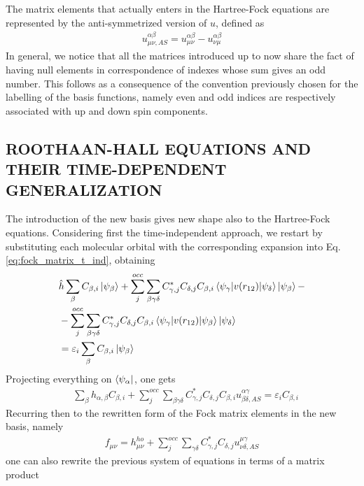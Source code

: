 The matrix elements that actually enters in the Hartree-Fock equations are represented by the anti-symmetrized version of $u$, defined as
\begin{align*}
    u^{\alpha\beta}_{\mu\nu,AS} = u^{\alpha\beta}_{\mu\nu} - u^{\alpha\beta}_{\nu\mu}
\end{align*}
In general, we notice that all the matrices introduced up to now share the fact of having null elements in correspondence of indexes whose sum gives an odd number. This follows as a consequence of the convention previously chosen for the labelling of the basis functions, namely even and odd indices are respectively associated with up and down spin components. 



\subsection{ROOTHAAN-HALL EQUATIONS AND THEIR TIME-DEPENDENT GENERALIZATION}
The introduction of the new basis gives new shape also to the Hartree-Fock equations. Considering first the time-independent approach, we restart by substituting each molecular orbital with the corresponding expansion into Eq.\,\ref{eq:fock_matrix_t_ind}, obtaining
\begin{align*}
    &\hat{h} \sum_{\beta} C_{\beta,i} \ket{\psi_\beta} + \sum_{j}^{occ} \sum_{\beta\gamma\delta} C_{\gamma,j}^* C_{\delta,j} C_{\beta,i} \bracketOP{\psi_\gamma}{\psi_\delta}{v(r_{12})} \ket{\psi_\beta} - \\
    &- \sum_{j}^{occ} \sum_{\beta\gamma\delta} C_{\gamma,j}^* C_{\delta,j} C_{\beta,i} \bracketOP{\psi_\gamma}{\psi_\beta}{v(r_{12})} \ket{\psi_\delta} \\
    &= \varepsilon_{i} \sum_{\beta} C_{\beta,i} \ket{\psi_\beta}
\end{align*}
Projecting everything on $\bra{\psi_\alpha}$, one gets
\begin{align*}
    & \sum_{\beta} h_{\alpha,\beta} C_{\beta,i} + \sum_{j}^{occ} \sum_{\beta\gamma\delta} C_{\gamma,j}^* C_{\delta,j} C_{\beta,i} u^{\alpha\gamma}_{\beta\delta,AS} =  \varepsilon_{i}  C_{\beta,i}
\end{align*}
Recurring then to the rewritten form of the Fock matrix elements in the new basis, namely
\begin{align*}
    f_{\mu\nu} =  h_{\mu\nu}^{ho} + \sum_{j}^{occ} \sum_{\gamma\delta} C_{\gamma,j}^* C_{\delta,j} u^{\mu\gamma}_{\nu\delta,AS}
\end{align*}
one can also rewrite the previous system of equations in terms of a matrix product
